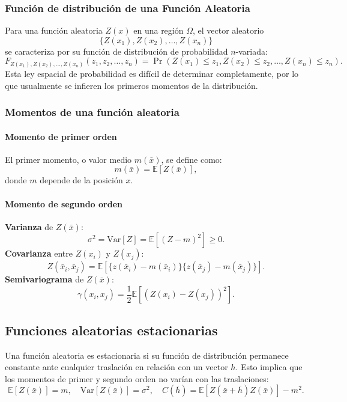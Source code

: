 \subsubsection{Función de distribución de una Función Aleatoria}

Para una función aleatoria \(Z(x)\) en una región \(\Omega\), el vector aleatorio
\[
\{ Z(x_1), Z(x_2), \ldots, Z(x_n) \}
\]
se caracteriza por su función de distribución de probabilidad \(n\)-variada:
\[
F_{Z(x_1),Z(x_2),\ldots,Z(x_n)}(z_1, z_2, \ldots, z_n) = \Pr\left( Z(x_1) \leq z_1, Z(x_2) \leq z_2, \ldots, Z(x_n) \leq z_n \right).
\]
Esta ley espacial de probabilidad es difícil de determinar completamente, por lo que usualmente se infieren los primeros momentos de la distribución.

\subsubsection{Momentos de una función aleatoria}

\paragraph{Momento de primer orden}
El primer momento, o valor medio \(m(\bar{x})\), se define como:
\[
m(\bar{x}) = \mathbb{E}[Z(\bar{x})],
\]
donde \(m\) depende de la posición \(x\).

\paragraph{Momento de segundo orden}
\textbf{Varianza} de \(Z(\bar{x})\):
\[
\sigma^2 = \text{Var}[Z] = \mathbb{E}[(Z - m)^2] \geq 0.
\]
\textbf{Covarianza} entre \(Z(x_i)\) y \(Z(x_j)\):
\[
Z(\bar{x}_i, \bar{x}_j) = \mathbb{E}\left[\{z(\bar{x}_i) - m(\bar{x}_i)\} \{z(\bar{x}_j) - m(\bar{x}_j)\}\right].
\]
\textbf{Semivariograma} de \(Z(\bar{x})\):
\[
\gamma(x_i, x_j) = \frac{1}{2} \mathbb{E} \left[ \left( Z(x_i) - Z(x_j) \right)^2 \right].
\]

\subsection{Funciones aleatorias estacionarias}

Una función aleatoria es estacionaria si su función de distribución permanece constante ante cualquier traslación en relación con un vector \(h\). Esto implica que los momentos de primer y segundo orden no varían con las traslaciones:
\[
\mathbb{E}[Z(\bar{x})] = m, \quad \text{Var}[Z(\bar{x})] = \sigma^2, \quad C(\bar{h}) = \mathbb{E} [Z(\bar{x}+\bar{h})Z(\bar{x})] - m^2.
\]

